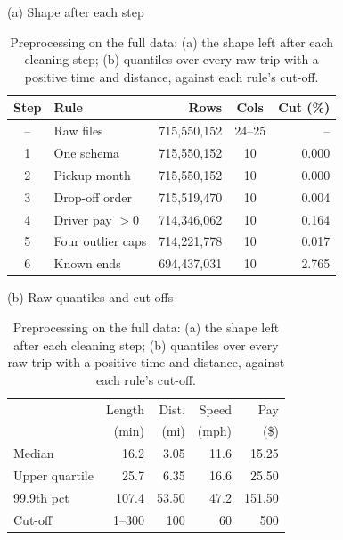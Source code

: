 \documentclass[11pt]{article}
\begin{document}
\begin{table}[htb]
    \centering
    \footnotesize
    \caption{Preprocessing on the full data: (a) the shape left after each cleaning step; (b) quantiles over every raw trip with a positive time and distance, against each rule's cut-off.}
    \label{tab:prep}
    \setlength{\tabcolsep}{4pt}
    \begin{minipage}[t]{0.55\textwidth}
        \centering
        (a) Shape after each step\\[2pt]
        \begin{tabular}{@{}cl rcr@{}}
            \toprule
            Step & Rule & Rows & Cols & Cut (\%) \\
            \midrule
            -- & Raw files & 715,550,152 & 24--25 & -- \\
            1 & One schema & 715,550,152 & 10 & 0.000 \\
            2 & Pickup month & 715,550,152 & 10 & 0.000 \\
            3 & Drop-off order & 715,519,470 & 10 & 0.004 \\
            4 & Driver pay $>0$ & 714,346,062 & 10 & 0.164 \\
            5 & Four outlier caps & 714,221,778 & 10 & 0.017 \\
            6 & Known ends & 694,437,031 & 10 & 2.765 \\
            \bottomrule
        \end{tabular}
    \end{minipage}%
    \begin{minipage}[t]{0.45\textwidth}
        \centering
        (b) Raw quantiles and cut-offs\\[2pt]
        \begin{tabular}{@{}l rrrr@{}}
            \toprule
            & Length & Dist. & Speed & Pay \\
            & (min) & (mi) & (mph) & (\$) \\
            \midrule
            Median & 16.2 & 3.05 & 11.6 & 15.25 \\
            Upper quartile & 25.7 & 6.35 & 16.6 & 25.50 \\
            99.9th pct & 107.4 & 53.50 & 47.2 & 151.50 \\
            \addlinespace
            Cut-off & 1--300 & 100 & 60 & 500 \\
            \bottomrule
        \end{tabular}
    \end{minipage}
\end{table}
\end{document}
